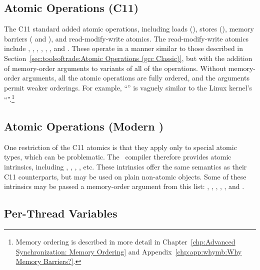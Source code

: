 \subsection{Atomic Operations (C11)}
\label{sec:toolsoftrade:Atomic Operations (C11)}

The C11 standard added atomic operations,
including loads (),
stores (),
memory barriers ( and
), and read-modify-write atomics.
The read-modify-write atomics include
,
,
,
,
,
,
and
.
These operate in a manner similar to those described in
Section~\ref{sec:toolsoftrade:Atomic Operations (gcc Classic)},
but with the addition of memory-order arguments to 
variants of all of the operations.
Without memory-order arguments, all the atomic operations are
fully ordered, and the arguments permit weaker orderings.
For example, ``''
is vaguely similar to the Linux kernel's ``''.\footnote{
	Memory ordering is described in more detail in
	Chapter~\ref{chp:Advanced Synchronization: Memory Ordering} and
	Appendix~\ref{chp:app:whymb:Why Memory Barriers?}.}

\subsection{Atomic Operations (Modern \GCC)}
\label{sec:toolsoftrade:Atomic Operations (Modern gcc)}

One restriction of the C11 atomics is that they apply only to special
atomic types, which can be problematic.
The \GNUC\ compiler therefore provides atomic intrinsics, including
,
,
,
, etc.
These intrinsics offer the same semantics as their C11 counterparts,
but may be used on plain non-atomic objects.
Some of these intrinsics may be passed a memory-order argument from
this list:
,
,
,
,
, and
.

\subsection{Per-Thread Variables}
\label{sec:toolsoftrade:Per-Thread Variables}

